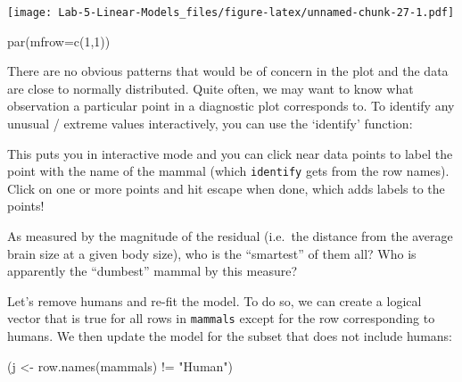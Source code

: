 \documentclass[
]{article}
\newenvironment{Shaded}{\begin{snugshade}}{\end{snugshade}}
\newcommand{\AttributeTok}[1]{\textcolor[rgb]{0.77,0.63,0.00}{#1}}
\newcommand{\DecValTok}[1]{\textcolor[rgb]{0.00,0.00,0.81}{#1}}
\newcommand{\FunctionTok}[1]{\textcolor[rgb]{0.00,0.00,0.00}{#1}}
\newcommand{\NormalTok}[1]{#1}
\newcommand{\OtherTok}[1]{\textcolor[rgb]{0.56,0.35,0.01}{#1}}
\newcommand{\SpecialCharTok}[1]{\textcolor[rgb]{0.00,0.00,0.00}{#1}}
\newcommand{\StringTok}[1]{\textcolor[rgb]{0.31,0.60,0.02}{#1}}
\begin{document}
\texttt{[image: Lab-5-Linear-Models\_files/figure-latex/unnamed-chunk-27-1.pdf]}

\begin{Shaded}
\begin{Highlighting}[]
\FunctionTok{par}\NormalTok{(}\AttributeTok{mfrow=}\FunctionTok{c}\NormalTok{(}\DecValTok{1}\NormalTok{,}\DecValTok{1}\NormalTok{))}
\end{Highlighting}
\end{Shaded}

There are no obvious patterns that would be of concern in the plot and
the data are close to normally distributed. Quite often, we may want to
know what observation a particular point in a diagnostic plot
corresponds to. To identify any unusual / extreme values interactively,
you can use the `identify' function:

\begin{Shaded}
\end{Shaded}

This puts you in interactive mode and you can click near data points to
label the point with the name of the mammal (which \texttt{identify}
gets from the row names). Click on one or more points and hit escape
when done, which adds labels to the points!

As measured by the magnitude of the residual (i.e.~the distance from the
average brain size at a given body size), who is the ``smartest'' of
them all? Who is apparently the ``dumbest'' mammal by this measure?

Let's remove humans and re-fit the model. To do so, we can create a
logical vector that is true for all rows in \texttt{mammals} except for
the row corresponding to humans. We then update the model for the subset
that does not include humans:

\begin{Shaded}
\begin{Highlighting}[]
\NormalTok{(j }\OtherTok{\textless{}{-}} \FunctionTok{row.names}\NormalTok{(mammals) }\SpecialCharTok{!=} \StringTok{"Human"}\NormalTok{)}
\end{Highlighting}
\end{Shaded}
\end{document}
